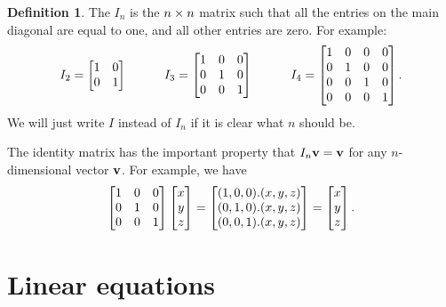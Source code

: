 \documentclass[a4paper]{book}
\theoremstyle{definition}
\newtheorem{definition}[theorem]{Definition}
\begin{document}
\begin{definition}
 The  $I_n$ is the $n\times n$ matrix such that all
 the entries on the main diagonal are equal to one, and all other
 entries are zero.  For example:
 {\small \[
  I_2 = \begin{bmatrix} 1&0 \\ 0&1 \end{bmatrix} \hspace{3em}
  I_3 = \begin{bmatrix} 1&0&0 \\ 0&1&0 \\ 0&0&1 \end{bmatrix} \hspace{3em}
  I_4 = \begin{bmatrix} 1&0&0&0 \\ 0&1&0&0 \\ 0&0&1&0 \\ 0&0&0&1 \end{bmatrix}.
 \]}
 We will just write $I$ instead of $I_n$ if it is clear what $n$
 should be.
\end{definition}
The identity matrix has the important property that
$I_n\mathbf{v}=\mathbf{v}$ for any $n$-dimensional vector $\mathbf{v}$.  For
example, we have
\[ \begin{bmatrix} 1&0&0 \\ 0&1&0 \\ 0&0&1 \end{bmatrix} \begin{bmatrix} x\\ y\\ z\end{bmatrix} = 
   \begin{bmatrix} (1,0,0).(x,y,z) \\
        (0,1,0).(x,y,z) \\
        (0,0,1).(x,y,z) \end{bmatrix} = 
   \begin{bmatrix} x \\ y \\ z \end{bmatrix}.
\]

\section{Linear equations}
\label{sec-linear}
\end{document}
